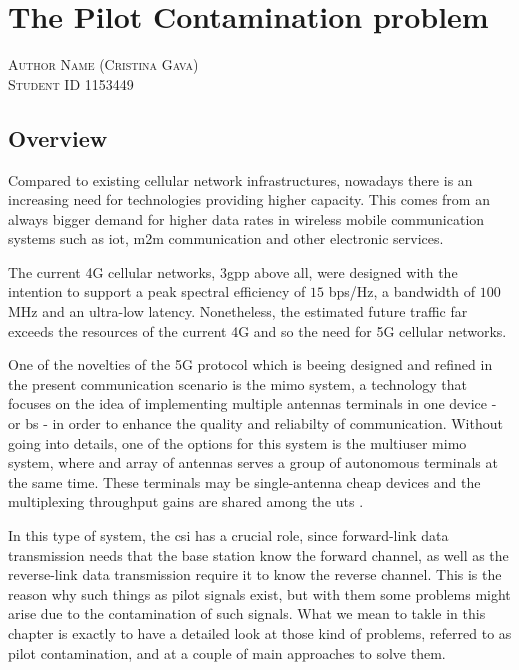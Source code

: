 \documentclass[11pt]{book}
\makeatletter
\newcommand{\chapterauthor}[1]{%
  {\parindent0pt\vspace*{-25pt}%
  \linespread{1.1} \scshape#1%
  \par\nobreak\vspace*{35pt}}
  \@afterheading%
}
\makeatother
\begin{document}

\chapter{The Pilot Contamination problem}
\chapterauthor{Author Name (Cristina Gava)\\
Student ID 1153449}

\section{Overview}
Compared to existing cellular network infrastructures, nowadays there is an increasing need for technologies providing higher capacity. This comes from an always bigger demand for higher data rates in wireless mobile communication systems such as \gls{iot}, \gls{m2m} communication and other electronic services.

The current 4G cellular networks, \gls{3gpp} above all, were designed with the intention to support a peak spectral efficiency of $15$ bps/Hz, a bandwidth of $100$ MHz and an ultra-low latency. Nonetheless, the estimated future traffic far exceeds the resources of the current 4G and so the need for 5G cellular networks.

One of the novelties of the 5G protocol which is beeing designed and refined in the present communication scenario is the \gls{mimo} system, a technology that focuses on the idea of implementing multiple antennas terminals in one device - or \gls{bs} - in order to enhance the quality and reliabilty of communication. Without going into details, one of the options for this system is the multiuser \gls{mimo} system, where and array of antennas serves a group of autonomous terminals at the same time. These terminals may be single-antenna cheap devices and the multiplexing throughput gains are shared among the \gls{ut}s \cite{Marzetta2010} \cite{Elijah2016}.

In this type of system, the \gls{csi} has a crucial role, since forward-link data transmission needs that the base station know the forward channel, as well as the reverse-link data transmission require it to know the reverse channel. This is the reason why such things as pilot signals exist, but with them some problems might arise due to the contamination of such signals. What we mean to takle in this chapter is exactly to have a detailed look at those kind of problems, referred to as pilot contamination, and at a couple of main approaches to solve them.
\end{document}
